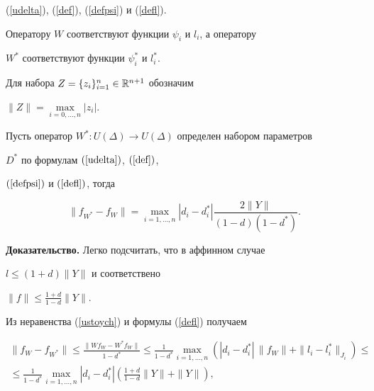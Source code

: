 (\ref{udelta}), (\ref{def}), (\ref{defpsi}) и (\ref{defl}).


Оператору $W$ соответствуют функции $\psi_i$ и $l_i$, а оператору


$W^*$ соответствуют функции $\psi_i^*$ и $l_i^*$.


Для набора $Z = {\{z_i\}_{i=1}^n} \in {\Bbb R}^{n+1}$ обозначим


$\| Z \| = \max\limits_{i=0,\dotsc,n } | z_i |$.





\begin{lem} \label{lusd}


Пусть оператор $W^*: U(\Delta) \to U(\Delta)$ определен набором параметров


$D^*$ по формулам $(\ref{udelta})$, $(\ref{def})$,


$(\ref{defpsi})$ и $(\ref{defl})$, тогда


$$




\| f_{W^*} - f_W \| = \max_{i=1,\dotsc,n} |d_i-d_i^*|


\frac{ 2 \| Y \| }{(1-d)(1-d^*)} .




$$


\end{lem}





{\bf Доказательство.} Легко подсчитать, что в аффинном случае


$l \le (1+d) \| Y \|$ и соответствено


$\| f \| \le \frac{1+d}{1-d} \| Y \|$.


Из неравенства (\ref{ustoych}) и формулы (\ref{defl}) получаем


\begin{multline*}


\| f_W - f_{W^*} \| \le \frac{\|W f_W-W^* f_W\|} {1-d^*} \le


\frac{1}{1-d^*} \max_{i=1,\dotsc,n} \left(


|d_i-d_i^*|\, \|f_W\| + \| l_i-l_i^* \|_{J_i} \right) \le \\


%


\le \frac{1}{1-d^*}\max_{i=1,\dotsc,n}


|d_i-d_i^*| \left(\frac{1+d}{1-d} \| Y \| + \| Y \| \right),


\end{multline*}


